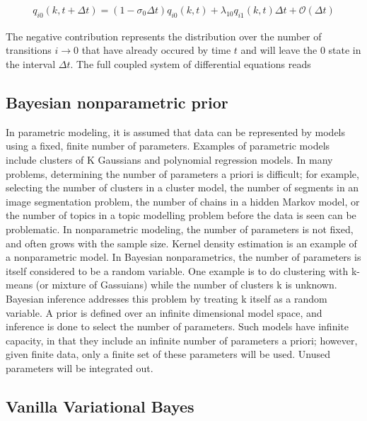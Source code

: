 \documentclass{ucetd}
\begin{document}
\begin{align*}
q_{i0}(k,t+\Delta t) = (1-\sigma_{0}\Delta t)q_{i0}(k,t) + \lambda_{10}q_{i1}(k,t)\Delta t + \mathcal{O}(\Delta t)
\end{align*}

The negative contribution represents the distribution over the number of transitions $i\rightarrow 0$ that have already occured by time $t$ and will leave the $0$ state in the interval $\Delta t$. The full coupled system of differential equations reads


\subsection{Bayesian nonparametric prior}

In parametric modeling, it is assumed that data can be represented by models using a fixed, finite number
of parameters. Examples of parametric models include clusters of K Gaussians and polynomial regression
models. In many problems, determining the number of parameters a priori is difficult; for example, selecting
the number of clusters in a cluster model, the number of segments in an image segmentation problem, the
number of chains in a hidden Markov model, or the number of topics in a topic modelling problem before
the data is seen can be problematic.
In nonparametric modeling, the number of parameters is not fixed, and often grows with the sample size.
Kernel density estimation is an example of a nonparametric model. In Bayesian nonparametrics, the number
of parameters is itself considered to be a random variable. One example is to do clustering with k-means (or
mixture of Gassuians) while the number of clusters k is unknown. Bayesian inference addresses this problem
by treating k itself as a random variable. A prior is defined over an infinite dimensional model space, and
inference is done to select the number of parameters. Such models have infinite capacity, in that they include
an infinite number of parameters a priori; however, given finite data, only a finite set of these parameters
will be used. Unused parameters will be integrated out.

\subsection{Vanilla Variational Bayes}
\end{document}
